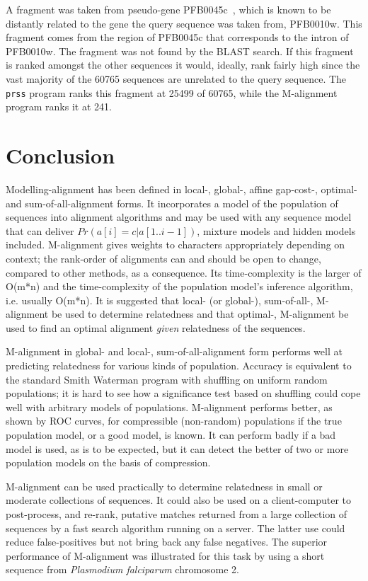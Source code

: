 \documentclass[a4paper,11pt,oneside]{article}
\begin{document}
A fragment was taken from pseudo-gene PFB0045c~\cite{huestis01}, which is
known to be distantly related to the gene the query sequence was taken from,
PFB0010w.  This fragment comes from the region of PFB0045c that corresponds to
the intron of PFB0010w.  The fragment was not found by the BLAST search.  If
this fragment is ranked amongst the other sequences it would, ideally, rank
fairly high since the vast majority of the 60765 sequences are unrelated to
the query sequence.  The \verb!prss! program ranks this fragment at 25499 of
60765, while the M-alignment program ranks it at 241.




\section{Conclusion}
\label{sec:conc}


Modelling-alignment has been defined in local-, global-, affine gap-cost-,
optimal- and sum-of-all-alignment forms.  It incorporates a model of the
population of sequences into alignment algorithms and may be used with any
sequence model that can deliver $Pr(a[i]=c|a[1..i-1])$, mixture models and
hidden models included.  M-alignment gives weights to characters appropriately
depending on context; the rank-order of alignments can and should be open to
change, compared to other methods, as a consequence.  Its time-complexity is
the larger of O(m*n) and the time-complexity of the population model's
inference algorithm, i.e. usually O(m*n).  It is suggested that local- (or
global-), sum-of-all-, M-alignment be used to determine relatedness and that
optimal-, M-alignment be used to find an optimal alignment {\em given}
relatedness of the sequences.

M-alignment in global- and local-, sum-of-all-alignment form performs well
at predicting relatedness for various kinds of population.
Accuracy is equivalent to the standard Smith Waterman program with shuffling
on uniform random populations;
it is hard to see how a significance test based on shuffling could
cope well with arbitrary models of populations.
M-alignment performs better, as shown by ROC curves,
for compressible (non-random) populations if the true
population model, or a good model, is known.
It can perform badly if a bad model is used, as is to be expected,
but it can detect the better of two or more population models
on the basis of compression.

M-alignment can be used practically to determine relatedness
in small or moderate collections of sequences.
It could also be used on a client-computer to post-process, and re-rank,
putative matches returned from a large collection of sequences
by a fast search algorithm running on a server.
The latter use could reduce false-positives but not bring back
any false negatives.  The superior performance of M-alignment was illustrated
for this task by using a short sequence from \emph{Plasmodium
falciparum} chromosome 2.
\end{document}
